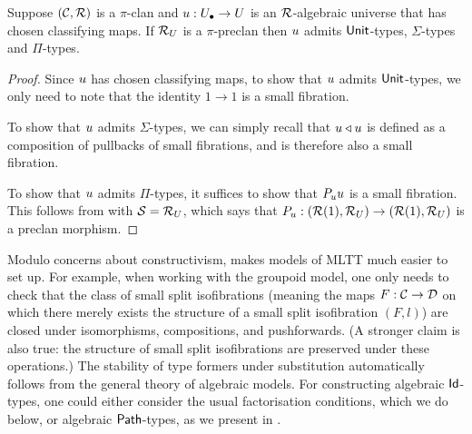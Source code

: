 \begin{proposition}\label{prop:constructing-alg-models}
  Suppose $(\mathcal{C},\mathcal{R})$ is a $\pi$-clan and ${u} : {U_\bullet} \to U$ is an $\mathcal{R}$-algebraic universe
  that has chosen classifying maps.
  If $\mathcal{R}_U$ is a $\pi$-preclan then
  ${u}$ admits $\mathsf{Unit}$-types, $\Sigma$-types and $\Pi$-types.
\end{proposition}
\begin{proof}
  Since ${u}$ has chosen classifying maps,
  to show that ${u}$ admits $\mathsf{Unit}$-types,
  we only need to note that the identity $1 \to 1$
  is a small fibration.

  To show that ${u}$ admits $\Sigma$-types,
  we can simply recall that ${u} \triangleleft {u}$
  is defined as a composition of pullbacks of small fibrations,
  and is therefore also a small fibration.

  To show that ${u}$ admits $\Pi$-types,
  it suffices to show that $P_{u} {u}$ is a small fibration.
  This follows from  with $\mathcal{S} = \mathcal{R}_U$,
  which says that $P_{u} : (\mathcal{R}(1),\mathcal{R}_U) \to (\mathcal{R}(1),\mathcal{R}_U)$ is a preclan morphism.
\end{proof}

Modulo concerns about constructivism,
 makes models of MLTT much easier to set up.
For example,
when working with the groupoid model,
one only needs to check that the class of small split isofibrations
(meaning the maps $F : \mathcal{C} \to \mathcal{D}$ on which there merely exists the
structure of a small split isofibration $(F,l)$)
are closed under isomorphisms, compositions, and pushforwards.
(A stronger claim is also true: the structure of small split isofibrations
are preserved under these operations.)
The stability of type formers under substitution automatically
follows from the general theory of algebraic models.
For constructing algebraic $\mathsf{Id}$-types,
one could either consider the usual factorisation conditions,
which we do below,
or algebraic $\mathop{\mathsf{Path}}$-types, as we present in .

